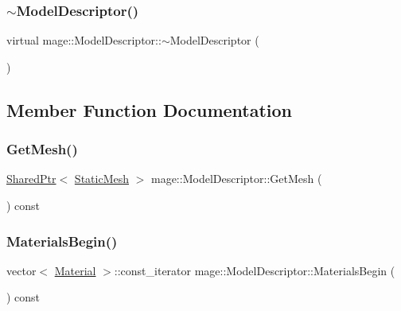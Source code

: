\subsubsection{\texorpdfstring{$\sim$\+Model\+Descriptor()}{~ModelDescriptor()}}
{\footnotesize\ttfamily virtual mage\+::\+Model\+Descriptor\+::$\sim$\+Model\+Descriptor (\begin{DoxyParamCaption}{ }\end{DoxyParamCaption})\hspace{0.3cm}{\ttfamily [virtual]}}



\subsection{Member Function Documentation}
\hypertarget{classmage_1_1_model_descriptor_a0781eed81d27ed936503056bbd46ab58}{}\label{classmage_1_1_model_descriptor_a0781eed81d27ed936503056bbd46ab58} 
\subsubsection{\texorpdfstring{Get\+Mesh()}{GetMesh()}}
{\footnotesize\ttfamily \hyperlink{namespacemage_a1e01ae66713838a7a67d30e44c67703e}{Shared\+Ptr}$<$ \hyperlink{classmage_1_1_static_mesh}{Static\+Mesh} $>$ mage\+::\+Model\+Descriptor\+::\+Get\+Mesh (\begin{DoxyParamCaption}{ }\end{DoxyParamCaption}) const}

\hypertarget{classmage_1_1_model_descriptor_a64a2ca531c03cd8d79eda3a728e6efa1}{}\label{classmage_1_1_model_descriptor_a64a2ca531c03cd8d79eda3a728e6efa1} 
\subsubsection{\texorpdfstring{Materials\+Begin()}{MaterialsBegin()}}
{\footnotesize\ttfamily vector$<$ \hyperlink{structmage_1_1_material}{Material} $>$\+::const\+\_\+iterator mage\+::\+Model\+Descriptor\+::\+Materials\+Begin (\begin{DoxyParamCaption}{ }\end{DoxyParamCaption}) const}

